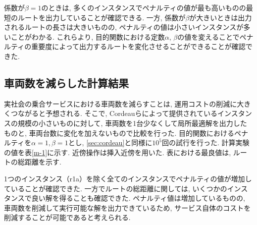係数が$\beta=1$のときは, 多くのインスタンスでペナルティの値が最も高いものの最短のルートを出力していることが確認できる. 一方, 係数が$\beta$が大きいときは出力されるルートの長さは大きいものの, ペナルティの値は小さいインスタンスが多いことがわかる.
これらより, 目的関数における定数$\alpha$, $\beta$の値を変えることでペナルティの重要度によって出力するルートを変化させることができることが確認できた.

\subsection{車両数を減らした計算結果}
実社会の乗合サービスにおける車両数を減らすことは, 運用コストの削減に大きくつながると予想される. そこで, Cordeauらによって提供されているインスタンスの規模の小さいものに対して, 車両数を1台少なくして局所最適解を出力したものと, 車両台数に変化を加えないもので比較を行った. 目的関数におけるペナルティを$\alpha=1, \beta=1$とし, \ref{sec:cordeau}と同様に$10^5$回の試行を行った. 計算実験の値を表\ref{m-1}に示す. 近傍操作は挿入近傍を用いた. 表における最良値は, ルートの総距離を示す.

1つのインスタンス（r1a）を除く全てのインスタンスでペナルティの値が増加していることが確認できた. 一方でルートの総距離に関しては, いくつかのインスタンスで良い解を得ることも確認できた. ペナルティ値は増加しているものの, 車両数を削減して実行可能な解を出力できているため, サービス自体のコストを削減することが可能であると考えられる.

